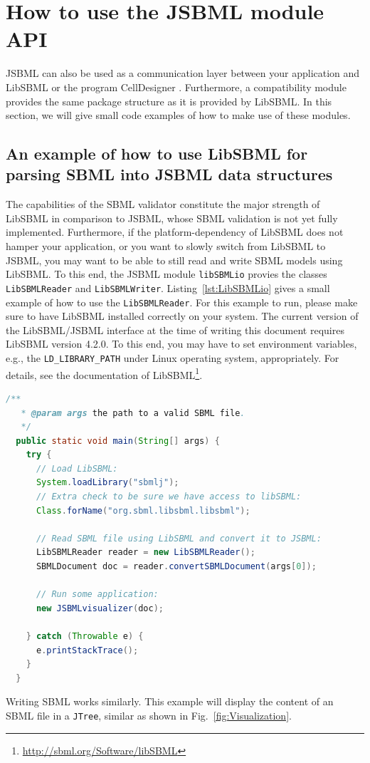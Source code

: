 \documentclass[
  BCOR12mm,
  letterpaper,
  11pt,
  headsepline,
  pointlessnumbers,
  tablecaptionabove,
  onelinecaption,
  headinclude,
  appendixprefix,
  idxtotoc,
  bibtotoc,
  twoside,
  titlepage
]{scrartcl}
\begin{document}
\section{How to use the JSBML module API}

JSBML can also be used as a communication layer
 between your application and LibSBML
\citep{Bornstein2008} or the program CellDesigner \citep{Funahashi2003}.
Furthermore, a compatibility module provides the same package structure as it is
provided by LibSBML. In this section, we will give small code examples of how to
make use of these modules.

\subsection{An example of how to use LibSBML for parsing SBML into JSBML data
structures}

The capabilities of the SBML validator constitute the
major strength of LibSBML \citep{Bornstein2008} in comparison to JSBML, whose
SBML validation is not yet fully implemented. Furthermore, if the
platform-dependency of LibSBML does not hamper your application, or you want to
slowly switch from LibSBML to JSBML, you may want to be able to still read and
write SBML models using LibSBML. To this end, the JSBML module
\texttt{libSBMLio} provies the classes \texttt{LibSBMLReader}
 and
\texttt{LibSBMLWriter}.
Listing~\vref{lst:LibSBMLio} gives a small example of how to use the
\texttt{LibSBMLReader}. For this example to run, please make sure to have
LibSBML installed correctly on your system. The current version of the
LibSBML/JSBML interface at the time of writing this document requires LibSBML
version 4.2.0.
To this end, you may have to set environment variables, e.g., the
\texttt{LD\_LIBRARY\_PATH} under Linux
operating system, appropriately. For details, see the
documentation of LibSBML\footnote{\url{http://sbml.org/Software/libSBML}}.
\begin{lstlisting}[language=Java,float,caption={A simple example for a
converting LibSBML data structures into JSBML data objects},label=lst:LibSBMLio]
  /**
   * @param args the path to a valid SBML file.
   */
  public static void main(String[] args) {
    try {
      // Load LibSBML:
      System.loadLibrary("sbmlj");
      // Extra check to be sure we have access to libSBML:
      Class.forName("org.sbml.libsbml.libsbml");

      // Read SBML file using LibSBML and convert it to JSBML:
      LibSBMLReader reader = new LibSBMLReader();
      SBMLDocument doc = reader.convertSBMLDocument(args[0]);

      // Run some application:
      new JSBMLvisualizer(doc);

    } catch (Throwable e) {
      e.printStackTrace();
    }
  }
\end{lstlisting}
Writing SBML works similarly. This example will display the content of an SBML
file in a \texttt{JTree}, similar as shown in Fig.~\vref{fig:Visualization}.
\end{document}
